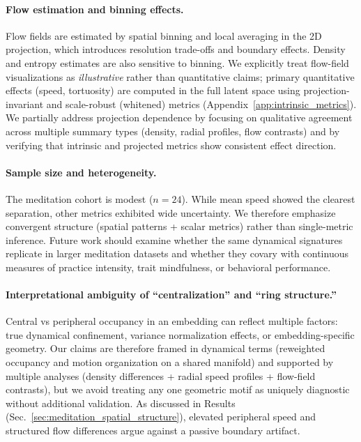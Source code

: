 \documentclass[5p,twocolumn,authoryear]{elsarticle}
\newcommand{\secref}[1]{Sec.~\ref{#1}}
\begin{document}
\paragraph{Flow estimation and binning effects.}
Flow fields are estimated by spatial binning and local averaging in the 2D projection, which introduces resolution trade-offs and boundary effects. Density and entropy estimates are also sensitive to binning. We explicitly treat flow-field visualizations as \emph{illustrative} rather than quantitative claims; primary quantitative effects (speed, tortuosity) are computed in the full latent space using projection-invariant and scale-robust (whitened) metrics (Appendix~\ref{app:intrinsic_metrics}). We partially address projection dependence by focusing on qualitative agreement across multiple summary types (density, radial profiles, flow contrasts) and by verifying that intrinsic and projected metrics show consistent effect direction.

\paragraph{Sample size and heterogeneity.}
The meditation cohort is modest ($n=24$). While mean speed showed the clearest separation, other metrics exhibited wide uncertainty. We therefore emphasize convergent structure (spatial patterns + scalar metrics) rather than single-metric inference. Future work should examine whether the same dynamical signatures replicate in larger meditation datasets and whether they covary with continuous measures of practice intensity, trait mindfulness, or behavioral performance.

\paragraph{Interpretational ambiguity of ``centralization'' and ``ring structure.''}
Central vs peripheral occupancy in an embedding can reflect multiple factors: true dynamical confinement, variance normalization effects, or embedding-specific geometry. Our claims are therefore framed in dynamical terms (reweighted occupancy and motion organization on a shared manifold) and supported by multiple analyses (density differences + radial speed profiles + flow-field contrasts), but we avoid treating any one geometric motif as uniquely diagnostic without additional validation. As discussed in Results (\secref{sec:meditation_spatial_structure}), elevated peripheral speed and structured flow differences argue against a passive boundary artifact.
\end{document}
